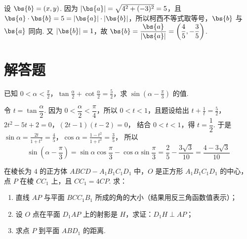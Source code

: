 \begin{solution}
设 \(\bs{b}=(x,y)\). 因为 \(|\bs{a}|=\sqrt{4^2+(-3)^2}=5\)，且
\(\bs{a}\cdot\bs{b}=5=|\bs{a}|\cdot|\bs{b}|\)，所以柯西不等式取等号，\(\bs{b}\) 与 \(\bs{a}\) 同向. 又 \(|\bs{b}|=1\)，故 \(\bs{b}=\dfrac{\bs{a}}{|\bs{a}|}=\left(\dfrac45,-\dfrac35\right)\).
\end{solution}

\section{解答题}
\begin{problem}
已知 \(0 < \alpha < \frac{\pi}{2}\)，\(\tan \frac{\alpha}{2} + \cot \frac{\alpha}{2} = \frac{5}{2}\)，求 \(\sin \left( \alpha - \frac{\pi}{3} \right)\) 的值.
\end{problem}

\begin{solution}
令 \(t=\tan\dfrac{\alpha}{2}\). 因为 \(0<\dfrac\alpha2<\dfrac\pi4\)，所以 \(0<t<1\)，且题设给出
\(t+\frac1t=\frac52\)，\(2t^2-5t+2=0\)，\((2t-1)(t-2)=0\)，
结合 \(0<t<1\)，得 \(t=\dfrac12\). 于是
\(\sin\alpha=\frac{2t}{1+t^2}=\frac45\)，\(\cos\alpha=\frac{1-t^2}{1+t^2}=\frac35\)，
所以
\[
\sin\left(\alpha-\frac\pi3\right)=\sin\alpha\cos\frac\pi3-\cos\alpha\sin\frac\pi3=\frac25-\frac{3\sqrt3}{10}=\frac{4-3\sqrt3}{10}
\]
\end{solution}

\begin{problem}
在棱长为 \(4\) 的正方体 \(ABCD - A_{1}B_{1}C_{1}D_{1}\) 中，\(O\) 是正方形 \(A_{1}B_{1}C_{1}D_{1}\) 的中心，点 \(P\) 在棱 \(CC_{1}\) 上，且 \(CC_{1} = 4CP\). 求：

\begin{enumerate}
\item 直线 \(AP\) 与平面 \(BCC_{1}B_{1}\) 所成的角的大小（结果用反三角函数值表示）；
\item 设 \(O\) 点在平面 \(D_{1}AP\) 上的射影是 \(H\)，求证：\(D_{1}H \perp AP\)；
\item 求点 \(P\) 到平面 \(ABD_{1}\) 的距离.
\end{enumerate}

\end{problem}

